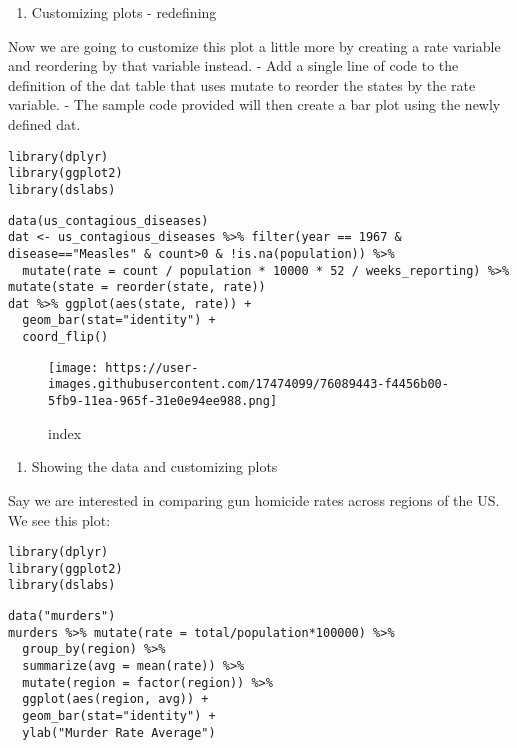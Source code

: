 \documentclass[]{article}
\providecommand{\tightlist}{%
  \setlength{\itemsep}{0pt}\setlength{\parskip}{0pt}}
\begin{document}
\begin{enumerate}
\def\labelenumi{\arabic{enumi}.}
\setcounter{enumi}{1}
\tightlist
\item
  Customizing plots - redefining
\end{enumerate}

Now we are going to customize this plot a little more by creating a rate
variable and reordering by that variable instead. - Add a single line of
code to the definition of the dat table that uses mutate to reorder the
states by the rate variable. - The sample code provided will then create
a bar plot using the newly defined dat.

\begin{verbatim}
library(dplyr)
library(ggplot2)
library(dslabs)
\end{verbatim}

\begin{verbatim}
data(us_contagious_diseases)
dat <- us_contagious_diseases %>% filter(year == 1967 & disease=="Measles" & count>0 & !is.na(population)) %>%
  mutate(rate = count / population * 10000 * 52 / weeks_reporting) %>% mutate(state = reorder(state, rate))
dat %>% ggplot(aes(state, rate)) +
  geom_bar(stat="identity") +
  coord_flip()
\end{verbatim}

\begin{figure}
\centering
\texttt{[image: https://user-images.githubusercontent.com/17474099/76089443-f4456b00-5fb9-11ea-965f-31e0e94ee988.png]}
\caption{index}
\end{figure}

\begin{enumerate}
\def\labelenumi{\arabic{enumi}.}
\setcounter{enumi}{2}
\tightlist
\item
  Showing the data and customizing plots
\end{enumerate}

Say we are interested in comparing gun homicide rates across regions of
the US. We see this plot:

\begin{verbatim}
library(dplyr)
library(ggplot2)
library(dslabs)
\end{verbatim}

\begin{verbatim}
data("murders")
murders %>% mutate(rate = total/population*100000) %>%
  group_by(region) %>%
  summarize(avg = mean(rate)) %>%
  mutate(region = factor(region)) %>%
  ggplot(aes(region, avg)) +
  geom_bar(stat="identity") +
  ylab("Murder Rate Average")
\end{verbatim}
\end{document}
